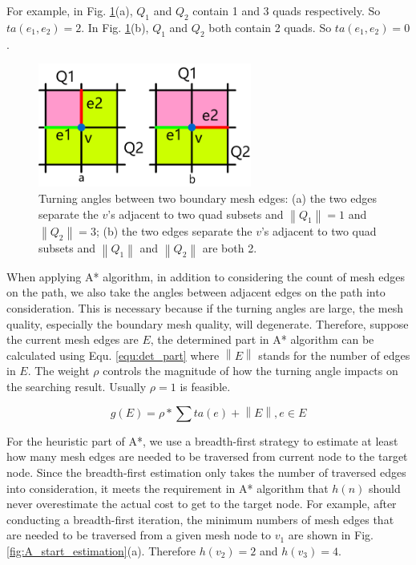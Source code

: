 \documentclass[final,5p,times,twocolumn]{elsarticle}
\begin{document}
For example, in Fig. \ref{fig:turning_angle}(a), $Q_1$ and $Q_2$ contain 1 and 3 quads respectively. So $ta(e_1,e_2)=2$. In Fig. \ref{fig:turning_angle}(b), $Q_1$ and $Q_2$ both contain 2 quads. So $ta(e_1,e_2)=0$.

\begin{figure}[htbp]
\begin{center}
\includegraphics[width=7cm]{turning_angle.png}
\caption{Turning angles between two boundary mesh edges: (a) the two edges separate the $v$'s adjacent to two quad subsets and $\left \| Q_1 \right \|=1$ and $\left \| Q_2 \right \|=3$; (b) the two edges separate the $v$'s adjacent to two quad subsets and $\left \| Q_1 \right \|$ and $\left \| Q_2 \right \|$ are both 2.}
\label{fig:turning_angle}
\end{center}
\end{figure}

When applying A* algorithm, in addition to considering the count of mesh edges on the path, we also take the angles between adjacent edges on the path into consideration. This is necessary because if the turning angles are large, the mesh quality, especially the boundary mesh quality, will degenerate. Therefore, suppose the current mesh edges are $E$, the determined part in A* algorithm can be calculated using Equ. \ref{equ:det_part} where $\left \| E \right \|$ stands for the number of edges in $E$. The weight $\rho $ controls the magnitude of how the turning angle impacts on the searching result. Usually $\rho =1$ is feasible.

\begin{equation}
\label{equ:det_part}
g(E) = \rho * \sum ta(e) + \left \| E \right \|, e \in E
\end{equation}

For the heuristic part of A*, we use a breadth-first strategy to estimate at least how many mesh edges are needed to be traversed from current node to the target node. Since the breadth-first estimation only takes the number of traversed edges into consideration, it meets the requirement in A* algorithm that $h(n)$ should never overestimate the actual cost to get to the target node. For example, after conducting a breadth-first iteration, the minimum numbers of mesh edges that are needed to be traversed from a given mesh node to $v_1$ are shown in Fig. \ref{fig:A_start_estimation}(a). Therefore $h(v_2)=2$ and $h(v_3)=4$.
\end{document}

